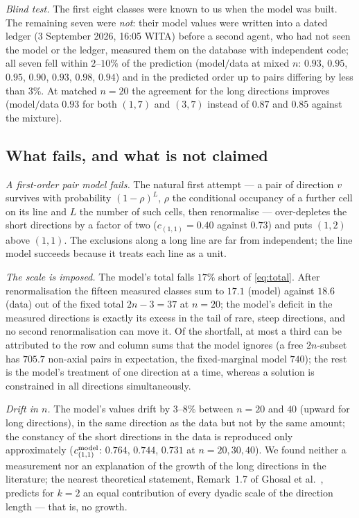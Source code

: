 \documentclass[11pt,a4paper]{article}
\begin{document}
\emph{Blind test.}  The first eight classes were known to us when the model was built.  The remaining seven were
\emph{not}: their model values were written into a dated ledger (3 September 2026, 16:05 WITA) before a second agent,
who had not seen the model or the ledger, measured them on the database with independent code; all seven fell within
$2$--$10\%$ of the prediction (model$/$data at mixed $n$: $0.93$, $0.95$, $0.95$, $0.90$, $0.93$, $0.98$, $0.94$)
and in the predicted order up to pairs differing by less than $3\%$.  At matched $n=20$ the agreement for the long
directions improves (model$/$data $0.93$ for both $(1,7)$ and $(3,7)$ instead of $0.87$ and $0.85$ against the mixture).

\subsection{What fails, and what is not claimed}\label{s:spfails}
\emph{A first-order pair model fails.}  The natural first attempt --- a pair of direction $v$ survives with probability
$(1-\rho)^{L}$, $\rho$ the conditional occupancy of a further cell on its line and $L$ the number of such cells, then
renormalise --- over-depletes the short directions by a factor of two ($c_{(1,1)}=0.40$ against $0.73$) and puts $(1,2)$
above $(1,1)$.  The exclusions along a long line are far from independent; the line model succeeds because it treats
each line as a unit.

\emph{The scale is imposed.}  The model's total falls $17\%$ short of \eqref{eq:total}.  After renormalisation the
fifteen measured classes sum to $17.1$ (model) against $18.6$ (data) out of the fixed total $2n-3=37$ at $n=20$; the
model's deficit in the measured directions is exactly its excess in the tail of rare, steep directions, and no second
renormalisation can move it.  Of the shortfall, at most a third can be attributed to the row and column sums that the
model ignores (a free $2n$-subset has $705.7$ non-axial pairs in expectation, the fixed-marginal model $740$);
the rest is the model's treatment of one direction at a time, whereas a solution is constrained in all directions
simultaneously.

\emph{Drift in $n$.}  The model's values drift by $3$--$8\%$ between $n=20$ and $40$ (upward for long directions),
in the same direction as the data but not by the same amount; the constancy of the short directions in the data is
reproduced only approximately ($c^{\rm model}_{(1,1)}$: $0.764$, $0.744$, $0.731$ at $n=20,30,40$).  We found neither
a measurement nor an explanation of the growth of the long directions in the literature; the nearest theoretical
statement, Remark~1.7 of Ghosal et al.\ \cite{Ghosal}, predicts for $k=2$ an equal contribution of every dyadic scale
of the direction length --- that is, no growth.
\end{document}
